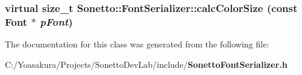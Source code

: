 \subsubsection{\setlength{\rightskip}{0pt plus 5cm}virtual size\_\-t Sonetto::FontSerializer::calcColorSize (const {\bf Font} $\ast$ {\em pFont})\hspace{0.3cm}{\tt  [protected, virtual]}}\label{class_sonetto_1_1_font_serializer_c8b81b2d54200a152677a778b7b6071a}




The documentation for this class was generated from the following file:\begin{CompactItemize}
\item 
C:/Yoasakura/Projects/SonettoDevLab/include/{\bf SonettoFontSerializer.h}\end{CompactItemize}
